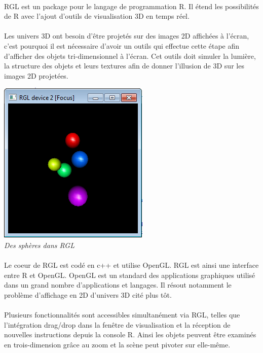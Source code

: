 \paragraph{}
RGL est un package pour le langage de programmation R. Il étend les possibilités de R avec l'ajout d'outils de visualisation 3D en temps réel.
\paragraph{}
Les univers 3D ont besoin d’être projetés sur des images 2D affichées à l’écran, c'est pourquoi il est nécessaire d'avoir un outils qui effectue cette étape afin d'afficher des objets tri-dimensionnel à l’écran. Cet outils doit simuler la lumière, la structure des objets et leurs textures afin de donner l'illusion de 3D sur les images 2D projetées.
\begin{center}
\includegraphics[scale=0.7]{screen_rgl2.png}\\
\textit{Des sphères dans RGL}
\end{center}


\paragraph{}
Le coeur de RGL est codé en c++ et utilise OpenGL. RGL est ainsi une interface entre R et OpenGL. OpenGL est un standard des applications graphiques utilisé dans un grand nombre d'applications et langages. Il résout notamment le problème d'affichage en 2D d'univers 3D cité plus tôt. 
\paragraph{}
Plusieurs fonctionnalités sont accessibles simultanément via RGL, telles que l’intégration drag/drop dans la fenêtre de visualisation et la réception de nouvelles instructions depuis la console R. Ainsi les objets peuvent être examinés en trois-dimension grâce au zoom et la scène peut pivoter sur elle-même.

